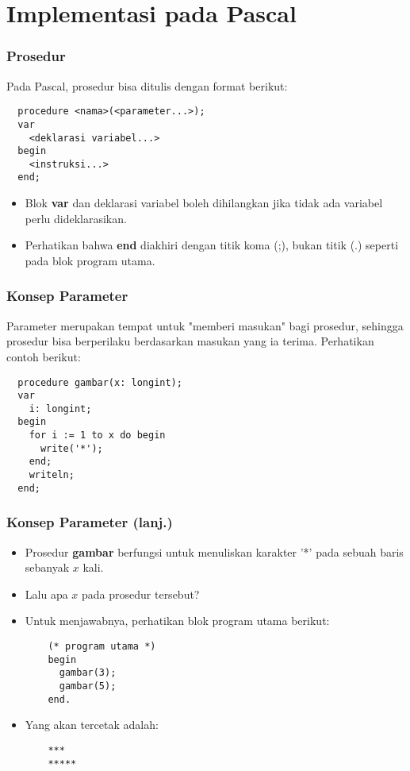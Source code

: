 \section{Implementasi pada Pascal}
\frame{\sectionpage}

\begin{frame}[fragile]
\frametitle{Prosedur}
Pada Pascal, prosedur bisa ditulis dengan format berikut:
\begin{lstlisting}
  procedure <nama>(<parameter...>);
  var
    <deklarasi variabel...>
  begin
    <instruksi...>
  end;
\end{lstlisting}
\begin{itemize}
  \item Blok \textbf{var} dan deklarasi variabel boleh dihilangkan jika tidak ada variabel perlu dideklarasikan.
  \item Perhatikan bahwa \textbf{end} diakhiri dengan titik koma (;), bukan titik (.) seperti pada blok program utama.
\end{itemize}
\end{frame}

\begin{frame}[fragile]
\frametitle{Konsep Parameter}
Parameter merupakan tempat untuk "memberi masukan" bagi prosedur, sehingga prosedur bisa berperilaku berdasarkan masukan yang ia terima.
\vfill
Perhatikan contoh berikut:
\begin{lstlisting}
  procedure gambar(x: longint);
  var
    i: longint;
  begin
    for i := 1 to x do begin
      write('*');
    end;
    writeln;
  end;
\end{lstlisting}
\end{frame}

\begin{frame}[fragile]
\frametitle{Konsep Parameter (lanj.)}
\begin{itemize}
  \item Prosedur \textbf{gambar} berfungsi untuk menuliskan karakter '*' pada sebuah baris sebanyak $x$ kali.
  \item Lalu apa $x$ pada prosedur tersebut?
  \item Untuk menjawabnya, perhatikan blok program utama berikut:
  \begin{lstlisting}
    (* program utama *)
    begin
      gambar(3);
      gambar(5);
    end.
  \end{lstlisting}
  \item Yang akan tercetak adalah:
  \begin{lstlisting}
    ***
    *****
  \end{lstlisting}
\end{itemize}
\end{frame}


